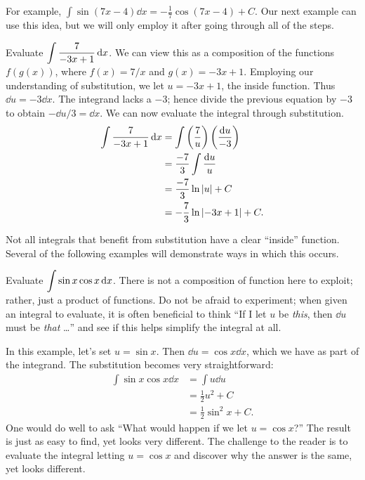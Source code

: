For example, $\int \sin (7x-4)\dd x = -\frac17\cos(7x-4)+C$. Our next example can use this idea, but we will only employ it after going through all of the steps.

\begin{example}\label{ex_sub3}%
Evaluate $\displaystyle \int \frac{7}{-3x+1}\operatorname{d}\! x$.
\solution
We can view this as a composition of the functions $f(g(x))$, where $f(x) = 7/x$ and $g(x) = -3x+1$. Employing our understanding of substitution, we let $u = -3x+1$, the inside function. Thus $\dd u = -3\dd x$. The integrand lacks a $-3$; hence divide the previous equation by $-3$ to obtain $-\dd u/3 = \dd x$. We can now evaluate the integral through substitution.
\begin{align*}
	\int \frac{7}{-3x+1}\operatorname{d}\! x
	&= \int\left(\frac{7}{u}\right)\left(\frac{\operatorname{d}\! u}{-3}\right) \\
	&= \frac{-7}3\int \frac{\operatorname{d}\! u}{u} \\
	&= \frac{-7}3\ln \left\lvert u \right\rvert + C\\
	&= -\frac73\ln\left\lvert -3x+1 \right\rvert + C.
\end{align*}
\end{example}

Not all integrals that benefit from substitution have a clear ``inside'' function. Several of the following examples will demonstrate ways in which this occurs.

\begin{example}\label{ex_sub10}%
Evaluate $\displaystyle \int \sin x\cos x\operatorname{d}\! x$.
\solution
There is not a composition of function here to exploit; rather, just a product of functions. Do not be afraid to experiment; when given an integral to evaluate, it is often beneficial to think ``If I let $u$ be \emph{this}, then $\dd u$ must be \emph{that} \ldots'' and see if this helps simplify the integral at all.

In this example, let's set $u = \sin x$. Then $\dd u = \cos x\dd x$, which we have as part of the integrand. The substitution becomes very straightforward:
\begin{align*}
	\int \sin x\cos x\dd x
	&=	\int u\dd u \\
	&= \frac12u^2+ C \\
	&= \frac12\sin^2 x + C.
\end{align*}
One would do well to ask ``What would happen if we let $u = \cos x$?'' The result is just as easy to find, yet looks very different. The challenge to the reader is to evaluate the integral letting $u = \cos x$ and discover why the answer is the same, yet looks different.
\end{example}

